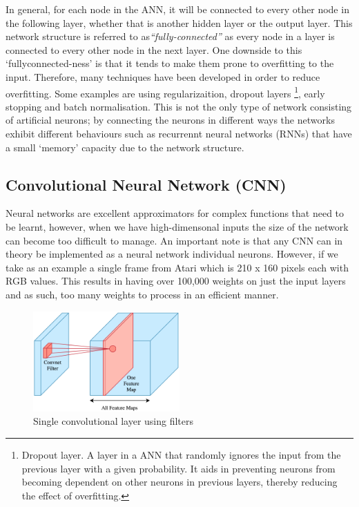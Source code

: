 In general, for each node in the ANN, it will be connected to every other node in the following layer, whether that is another hidden layer or the output layer. This network structure is referred to as\textit{``fully-connected''} as every node in a layer is connected to every other node in the next layer. One downside to this `fullyconnected-ness' is that it tends to make them prone to overfitting to the input. Therefore, many techniques have been developed in order to reduce overfitting. Some examples are using regularizaition, dropout layers \footnote{Dropout layer. A layer in a ANN that randomly ignores the input from the previous layer with a given probability. It aids in preventing neurons from becoming dependent on other neurons in previous layers, thereby reducing the effect of overfitting.}, early stopping and batch normalisation. This is not the only type of network consisting of artificial neurons; by connecting the neurons in different ways the networks exhibit different behaviours such as recurrennt neural networks (RNNs) that have a small `memory' capacity due to the network structure.

\subsection{Convolutional Neural Network (CNN)}
\label{dsgn:sec:dl:cnn}
Neural networks are excellent approximators for complex functions that need to be learnt, however, when we have high-dimensonal inputs the size of the network can become too difficult to manage. An important note is that any CNN can in theory be implemented as a neural network individual neurons. However, if we take as an example a single frame from Atari which is 210 x 160 pixels each with RGB values. This results in having over 100,000 weights on just the input layers and as such, too many weights to process in an efficient manner.

\begin{figure}[htbp]
	\centering
	\includegraphics[width=0.5\textwidth]{chapters/chapter3/images/cnn.png}
	\caption{Single convolutional layer using filters
		\label{fig:single-cnn-layer}
	}
\end{figure}

